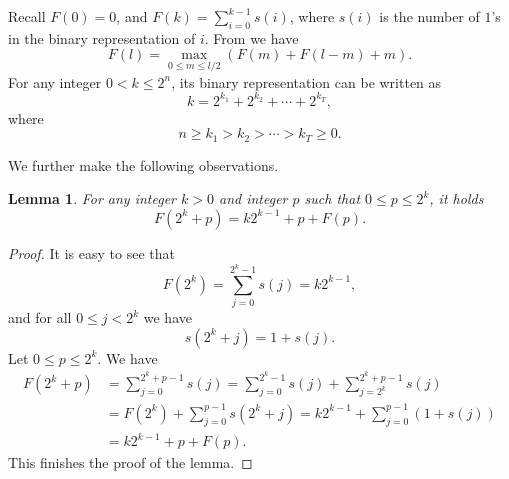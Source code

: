 \documentclass[11pt]{amsart}
\newtheorem{lemma}[theorem]{Lemma}
\theoremstyle{definition}
\renewcommand{\1}{{\mathbbm{1}}}
\begin{document}
Recall $F(0)=0$, and  $F(k)=\sum_{i=0}^{k-1} s(i)$, where $s(i)$ is the number of $1$'s in the binary representation of $i$. 
From {\cite[Remark 2.5]{hart}} we have
    \begin{equation*}
        F(l) = \max_{0\leq m\leq l/2} (F(m)+F(l-m)+m).
    \end{equation*}
For any integer $0 < k \leq 2^n$, its binary representation can be written as
\[
k = 2^{k_1} + 2^{k_2} + \cdots + 2^{k_T},
\]
where 
\[
n \geq k_1 > k_2 > \cdots > k_T \geq 0.
\]

We further make the following observations.

\begin{lemma}\label{lm:obv1}
    For any integer $k>0$ and integer $p$ such that $0 \leq p \leq 2^k$, it holds 
    $$F(2^k + p) = k 2^{k-1} + p + F(p).$$
\end{lemma}
\begin{proof}
    It is easy to see that 
    \begin{equation}
    \label{eq:F2k}
           F(2^k) = \sum_{j=0}^{2^k-1}s(j)=k2^{k-1},
    \end{equation}
    and for all $0\leq j< 2^{k}$ we have
    \[
    s(2^{k}+j) = 1+s(j) .
    \]
Let $0 \leq p \leq  2^k$.    We have
    \begin{align*}
        F(2^k + p) &= \sum_{j=0}^{2^k + p - 1} s(j) 
        = \sum_{j=0}^{2^k - 1} s(j) + \sum_{j=2^k}^{2^k + p - 1} s(j) \\
        &= F(2^k) + \sum_{j=0}^{p-1} s(2^k + j) = k 2^{k-1} + \sum_{j=0}^{p-1} \left(1 + s(j)\right) \\
        &= k 2^{k-1} + p + F(p).
    \end{align*}
    This finishes the proof of the lemma. 
\end{proof}
\end{document}
